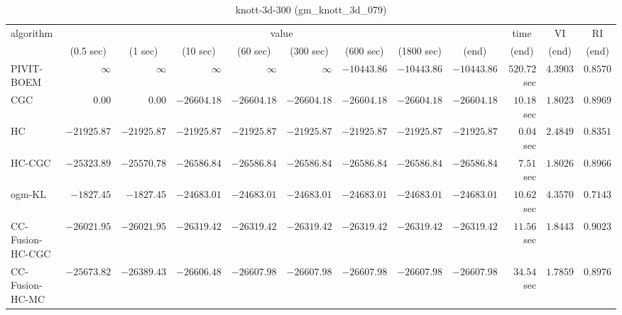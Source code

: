 \begin{table}[H]
\scriptsize
\centering
\caption{knott-3d-300 (gm\_knott\_3d\_079)}
\label{tab:anytimetable-knott-3d-300-gm-knott-3d-079}
\begin{tabular}{lrrrrrrrrrrr}
\toprule
           algorithm &                                   \multicolumn{8}{c}{value} & \multicolumn{1}{c}{time}    & \multicolumn{1}{c}{VI}  & \multicolumn{1}{c}{RI} \\  
\cmidrule(lr){2-9}\cmidrule(lr){10-10} \cmidrule(lr){11-11} \cmidrule(lr){12-12}   
                     & \multicolumn{1}{c}{(0.5 sec)} & \multicolumn{1}{c}{(1 sec)} & \multicolumn{1}{c}{(10 sec)} & \multicolumn{1}{c}{(60 sec)} & \multicolumn{1}{c}{(300 sec)} & \multicolumn{1}{c}{(600 sec)} & \multicolumn{1}{c}{(1800 sec)} & \multicolumn{1}{c}{(end)} & \multicolumn{1}{c}{(end)}    & \multicolumn{1}{c}{(end)}   & \multicolumn{1}{c}{(end)}  \\ \midrule 
          PIVIT-BOEM & $\infty$ & $\infty$ & $\infty$ & $\infty$ & $\infty$ & $    -10443.86$ & $    -10443.86$ & $    -10443.86$ & $       520.72$ sec    & $       4.3903$  & $       0.8570$ \\ 
                 CGC & $         0.00$ & $         0.00$ & $    -26604.18$ & $    -26604.18$ & $    -26604.18$ & $    -26604.18$ & $    -26604.18$ & $    -26604.18$ & $        10.18$ sec    & $       1.8023$  & $       0.8969$ \\ 
                  HC & $    -21925.87$ & $    -21925.87$ & $    -21925.87$ & $    -21925.87$ & $    -21925.87$ & $    -21925.87$ & $    -21925.87$ & $    -21925.87$ & $         0.04$ sec    & $       2.4849$  & $       0.8351$ \\ 
              HC-CGC & $    -25323.89$ & $    -25570.78$ & $    -26586.84$ & $    -26586.84$ & $    -26586.84$ & $    -26586.84$ & $    -26586.84$ & $    -26586.84$ & $         7.51$ sec    & $       1.8026$  & $       0.8966$ \\ 
              ogm-KL & $     -1827.45$ & $     -1827.45$ & $    -24683.01$ & $    -24683.01$ & $    -24683.01$ & $    -24683.01$ & $    -24683.01$ & $    -24683.01$ & $        10.62$ sec    & $       4.3570$  & $       0.7143$ \\ 
    CC-Fusion-HC-CGC & $    -26021.95$ & $    -26021.95$ & $    -26319.42$ & $    -26319.42$ & $    -26319.42$ & $    -26319.42$ & $    -26319.42$ & $    -26319.42$ & $        11.56$ sec    & $       1.8443$  & $       0.9023$ \\ 
     CC-Fusion-HC-MC & $    -25673.82$ & $    -26389.43$ & $    -26606.48$ & $    -26607.98$ & $    -26607.98$ & $    -26607.98$ & $    -26607.98$ & $    -26607.98$ & $        34.54$ sec    & $       1.7859$  & $       0.8976$ \\ 

\end{tabular}
\end{table}
